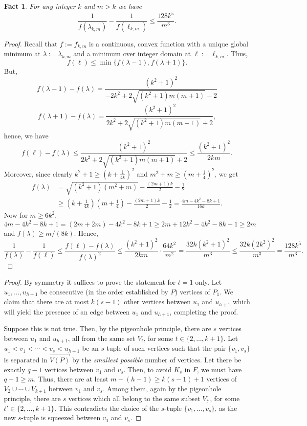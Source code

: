 \documentclass[reqno, 12pt]{amsart}
\numberwithin{equation}{section}
\numberwithin{figure}{section}
\theoremstyle{plain}
\newtheorem{fact}[thm]{Fact}
\theoremstyle{definition}
\begin{document}
\begin{fact}
\label{diff}
For any integer $k$ and $m>k$ we have
$$\frac1{f(\lambda_{k,m})}-\frac1{f(\ell_{k,m})}\le\frac{128k^5}{m^3}.$$
\end{fact}
\begin{proof}
Recall that $f:=f_{k,m}$ is a continuous, convex function with a unique global minimum at $\lambda:=\lambda_{k,m}$ and a minimum over integer domain at $\ell:=\ell_{k,m}$. Thus,
\[
f(\ell)\le\min\{f(\lambda-1),f(\lambda+1)\}.
\]
But,
\[
 f(\lambda-1)-f(\lambda) = \frac{(k^2+1)^2}{-2k^2+2\sqrt{(k^2+1)m(m+1)}-2}
\]
\[
f(\lambda+1)-f(\lambda) = \frac{(k^2+1)^2}{2k^2+2\sqrt{(k^2+1)m(m+1)}+2},
\]
hence, we have
$$f(\ell)-f(\lambda)\le \frac{(k^2+1)^2}{2k^2+2\sqrt{(k^2+1)m(m+1)}+2}\le\frac{(k^2+1)^2}{2km}.$$
Moreover, since clearly $k^2+1 \ge \left(k+\frac{1}{4k}\right)^2$ and $m^2+m\ge \left(m+\frac{1}{4}\right)^2$, we get
\begin{align*}
f(\lambda)&=\sqrt{(k^2+1)(m^2+m)} - \frac{(2m+1)k}{2} - \frac{1}{2}\\
&\ge \left(k+\frac{1}{4k}\right)\left(m+\frac{1}{4}\right) - \frac{(2m+1)k}{2} - \frac{1}{2}
=\frac{4m-4k^2-8k+1}{16k}.
\end{align*}
Now for $m\ge 6k^2$,
\[
4m-4k^2-8k+1 = (2m + 2m) -4k^2-8k+1 \ge 2m + 12k^2 -4k^2-8k+1 \ge 2m
\]
and $f(\lambda)\ge m/(8k)$. Hence,
\[
\frac1{f(\lambda)}-\frac1{f(\ell)}\le\frac{f(\ell)-f(\lambda)}{f(\lambda)^2}\le
\frac{(k^2+1)^2}{2km} \cdot \frac{64k^2}{m^2}
= \frac{32k(k^2+1)^2}{m^3} \le \frac{32k(2k^2)^2}{m^3}
=\frac{128k^5}{m^3}.
\]
\end{proof}


\hpathh*
\begin{proof} By symmetry it suffices to prove the statement for $t=1$ only. Let $u_1,\dots,u_{h+1}$ be consecutive (in the order established by $P$) vertices of $P_1$. We claim that there are at most $k(s-1)$ other vertices between $u_1$ and $u_{h+1}$ which will yield the presence of an edge between $u_1$ and $u_{h+1}$, completing the proof.

Suppose this is not true. Then, by the pigeonhole principle, there are $s$ vertices between $u_1$ and $u_{h+1}$, all from the same set $V_t$, for some $t\in\{2,\dots,k+1\}$.   Let $u_1<v_1<\cdots <v_s<u_{h+1}$ be an $s$-tuple of such vertices such that the pair $\{v_1,v_s\}$ is separated in $\overrightarrow{V(P)}$ by the \emph{smallest possible} number of vertices. Let there be exactly $q-1$ vertices between $v_1$ and $v_{s}$. Then, to avoid $K_s$ in $F$, we must have $q-1\ge m$. Thus, there are at least $m - (h-1) \geq k(s-1)+1$ vertices of $V_2\cup\cdots\cup V_{k+1}$ between $v_1$ and $v_{s}$. Among them, again by the pigeonhole principle, there are  $s$ vertices which all belong to the same subset $V_{t'}$, for some $t'\in\{2,\dots,k+1\}$. This contradicts the choice of the $s$-tuple $\{v_1,\dots,v_s\}$, as the new $s$-tuple is squeezed between $v_1$ and $v_{s}$.
\end{proof}
\end{document}
